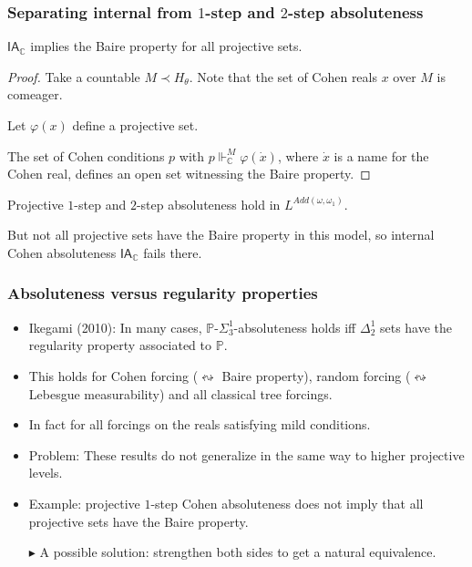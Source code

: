 \documentclass[handout, dvipsnames, usenames, 9pt, serif]{beamer}
\newcommand{\PP}{\mathbb{P}}
\newcommand{\CC}{\mathbb{C}}
\newcommand{\IA}{\mathsf{IA}}
\newcommand{\cb}{\color{blue}}
\begin{document}
\begin{frame} 
\frametitle{Separating internal from $1$-step and $2$-step absoluteness} 

\begin{fact} 
$\IA_\CC$ implies the {\cb Baire property} for all projective sets. 
\end{fact} 
\pause 
\begin{proof} 
Take a countable $M\prec H_\theta$. Note that the set of Cohen reals $x$ over $M$ is comeager. 

\medskip 
Let $\varphi(x)$ define a projective set. 

\medskip 
The set of Cohen conditions $p$ with {\cb $p\Vdash^M_{\CC}\varphi(\dot{x})$}, where $\dot{x}$ is a name for the Cohen real, defines an open set witnessing the Baire property. 
\end{proof} 

\pause  

\bigskip 
Projective {\cb $1$-step and $2$-step} absoluteness hold in $L^{Add(\omega,\omega_1)}$. 

\medskip 
But not all projective sets have the Baire property in this model, so internal Cohen absoluteness {\cb $\IA_\CC$ fails} there. 

\end{frame}



\iffalse 

\begin{frame} 
\frametitle{Absoluteness versus regularity properties} 

\begin{itemize} 
\item 
Ikegami (2010): 
In many cases, $\PP$-$\Sigma^1_3$-absoluteness holds iff $\Delta^1_2$ sets have the regularity property associated to $\PP$. 
\pause  
\item 
This holds for Cohen forcing ({\color{blue}$\leftrightsquigarrow$} Baire property), random forcing ({\color{blue}$\leftrightsquigarrow$} Lebesgue measurability) and all classical tree forcings. 
\item 
In fact for all forcings on the reals satisfying mild conditions. 
\pause  
\item 
{\color{blue} Problem:} These results do not generalize in the same way to higher projective levels. 
\item 
Example: projective $1$-step Cohen absoluteness does not imply that all projective sets have the Baire property. 
\pause  
\item[{\color{Maroon}$\blacktriangleright$}] 
{\color{Maroon} A possible solution: strengthen both sides to get a natural equivalence. } 
\end{itemize} 

\end{frame}
\end{document}
